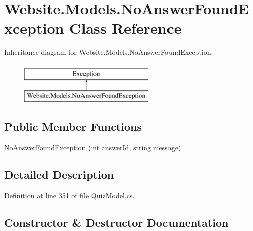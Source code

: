 \hypertarget{class_website_1_1_models_1_1_no_answer_found_exception}{}\section{Website.\+Models.\+No\+Answer\+Found\+Exception Class Reference}
\label{class_website_1_1_models_1_1_no_answer_found_exception}
Inheritance diagram for Website.\+Models.\+No\+Answer\+Found\+Exception\+:\begin{figure}[H]
\begin{center}
\leavevmode
\includegraphics[height=2.000000cm]{class_website_1_1_models_1_1_no_answer_found_exception}
\end{center}
\end{figure}
\subsection*{Public Member Functions}
\begin{DoxyCompactItemize}
\item 
\hyperlink{class_website_1_1_models_1_1_no_answer_found_exception_a05e99e9cd704fe966a97c1662ed1f696}{No\+Answer\+Found\+Exception} (int answer\+Id, string message)
\end{DoxyCompactItemize}


\subsection{Detailed Description}


Definition at line 351 of file Quiz\+Model.\+cs.



\subsection{Constructor \& Destructor Documentation}
\hypertarget{class_website_1_1_models_1_1_no_answer_found_exception_a05e99e9cd704fe966a97c1662ed1f696}{}
